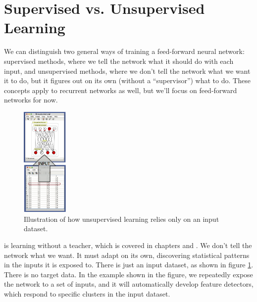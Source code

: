 
\section{Supervised vs. Unsupervised Learning}

We can distinguish two general ways of training a feed-forward neural network: supervised methods, where we tell the network what it should do with each input, and unsupervised methods, where we don't tell the network what we want it to do, but it figures out on its own (without a ``supervisor'') what to do. These concepts apply to recurrent networks as well, but we'll focus on feed-forward networks for now.

\begin{figure}[h]
\centering
\includegraphics[width=0.2\textwidth]{./images/dataset_unsupervised.png}
\caption[Simbrain screenshot with graphical elements added by Pamela Payne.]{Illustration of how unsupervised learning relies only on an input dataset.}
\label{unsupervised_learning}
\end{figure}

  is learning without a teacher, which is covered in chapters  and . We don't tell the network what we want. It must adapt on its own, discovering statistical patterns in the inputs it is exposed to. There is just an input dataset, as shown in figure \ref{unsupervised_learning}. There is no target data.  In the example shown in the figure, we repeatedly expose the network to a set of inputs, and it will automatically develop feature detectors, which respond to specific clusters in the input dataset.

